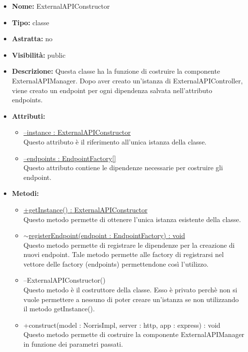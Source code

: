 			
			\begin{itemize}
			\item \textbf{Nome:} ExternalAPIConstructor
			\item \textbf{Tipo:} classe
			
		\item \textbf{Astratta:}
		no
			\item \textbf{Visibilità:} public
			\item \textbf{Descrizione:} Questa classe ha la funzione di costruire la componente ExternalAPIManager. Dopo aver creato un'istanza di ExternalAPIController, viene creato un endpoint per ogni dipendenza salvata nell'attributo endpoints.
			\item \textbf{Attributi:}
				\begin{itemize}
				\setlength{\itemsep}{5pt}
				
					\item[\ding{111}] \underline{--instance : ExternalAPIConstructor} \\ [1mm] Questo attributo è il riferimento all'unica istanza della classe.
					\item[\ding{111}] \underline{--endpoints : EndpointFactory[]} \\ [1mm] Questo attributo contiene le dipendenze necessarie per costruire gli endpoint.
				\end{itemize}
		
			\item \textbf{Metodi:}
				\begin{itemize}
				\setlength{\itemsep}{5pt}
				
					\item[\ding{111}] {\underline{+getInstance() : ExternalAPIConstructor}} \\ [1mm] Questo metodo permette di ottenere l'unica istanza esistente della classe.
					\item[\ding{111}] {\underline{\(\sim\)registerEndpoint(endpoint : EndpointFactory) : void}} \\ [1mm] Questo metodo permette di registrare le dipendenze per la creazione di nuovi endpoint. Tale metodo permette alle factory di registrarsi nel vettore delle factory (endpoints) permettendone così l'utilizzo.
					\item[\ding{111}] {{--ExternalAPIConstructor()}} \\ [1mm] Questo metodo è il costruttore della classe.  Esso è privato perchè non si vuole permettere a nessuno di poter creare un’istanza se non utilizzando il metodo getInstance().

					\item[\ding{111}] {{+construct(model : NorrisImpl, server : http, app : express) : void}} \\ [1mm] Questo metodo permette di costruire la componente ExternalAPIManager in funzione dei parametri passati.
				\end{itemize}
		
			\end{itemize}

